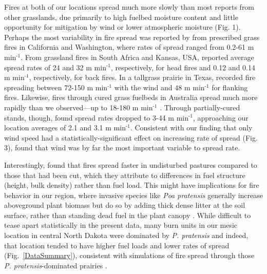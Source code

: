 \documentclass[referee, 
		     sn-basic]{sn-jnl}
\begin{document}
\begin{linenumbers}
Fires at both of our locations spread much more slowly than most reports
from other grasslands, due primarily to high fuelbed moisture content
and little opportunity for mitigation by wind or lower atmospheric
moisture (Fig. 1). Perhaps the most variability in fire spread was
reported by \citet{sneeuwjagt1977} from prescribed grass fires in
California and Washington, where rates of spread ranged from 0.2-61 m
min\(^{\text{-}1}\). From grassland fires in South Africa and Kansas,
USA, \citet{trollope2002} reported average spread rates of 24 and 32 m
min\(^{\text{-}1}\), respectively, for head fires and 0.12 and 0.14 m
min\(^{\text{-}1}\), respectively, for back fires. In a tallgrass
prairie in Texas, \citet{clements2019} recorded fire spreading between
72-150 m min\(^{\text{-}1}\) with the wind and 48 m min\(^{\text{-}1}\)
for flanking fires. Likewise, fires through cured grass fuelbeds in
Australia spread much more rapidly than we observed---up to 18-180 m
min\(^{\text{-}1}\) \citep{cheney1993, cheney1995, cruz2015}. Through
partially-cured stands, though, \citet{cruz2015} found spread rates
dropped to 3-44 m min\(^{\text{-}1}\), approaching our location averages
of 2.1 and 3.1 m min\(^{\text{-}1}\). Consistent with our finding that
only wind speed had a statistically-significant effect on increasing
rate of spread (Fig. 3), \citet{cheney1993} found that wind was by far
the most important variable to spread rate.

Interestingly, \citet{cheney1993} found that fires spread faster in
undisturbed pastures compared to those that had been cut, which they
attribute to differences in fuel structure (height, bulk density) rather
than fuel load. This might have implications for fire behavior in our
region, where invasive species like \emph{Poa pratensis} generally
increase aboveground plant biomass but do so by adding thick dense
litter at the soil surface, rather than standing dead fuel in the plant
canopy \citep{gasch2020}. While difficult to tease apart statistically
in the present data, many burn units in our mesic location in central
North Dakota were dominated by \emph{P. pratensis} and indeed, that
location tended to have higher fuel loads and lower rates of spread
(Fig.~\ref{DataSummary}), consistent with simulations of fire spread through those
\emph{P. pratensis}-dominated prairies \citep{yurkonis2019}.


\end{linenumbers}
\end{document}
